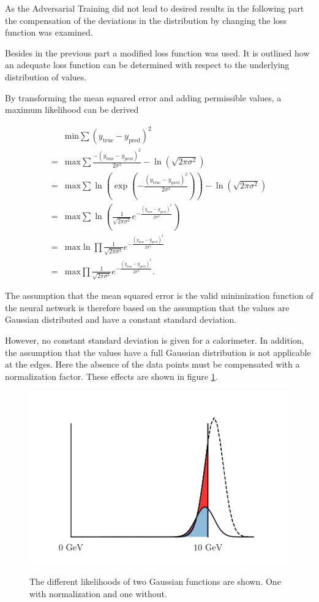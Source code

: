 \documentclass[12pt, a4paper]{thesis}
\begin{document}
As the Adversarial Training did not lead to desired results in the
following part the compensation of the deviations in the distribution
by changing the loss function was examined.

Besides in the previous part a modified loss function was used. It is
outlined how an adequate loss function can be determined with respect
to the underlying distribution of values.

By transforming the mean squared error and adding permissible values,
a maximum likelihood can be derived

\begin{align}
    &\text{min} \sum (y_{\text{true}}-y_{\text{pred}})^2 \\
    =&\text{max} \sum\frac{-(y_{\text{true}}-y_{\text{pred}})^2}{2 \sigma^2} - \ln(\sqrt{2\pi \sigma^2}) \\
    = &\text{max} \sum \ln(\exp(-\frac{(y_{\text{true}}-y_{\text{pred}})^2}{2 \sigma^2})) - \ln(\sqrt{2\pi \sigma^2}) \\
    = &\text{max} \sum \ln( \frac{1}{\sqrt{2\pi \sigma^2}} e^{-\frac{(y_{\text{true}}-y_{\text{pred}})^2}{2 \sigma^2}}) \\
    = &\text{max} \ln \prod \frac{1}{\sqrt{2\pi \sigma^2}} e^{-\frac{(y_{\text{true}}-y_{\text{pred}})^2}{2 \sigma^2}}\\
    = &\text{max} \prod \frac{1}{\sqrt{2\pi \sigma^2}} e^{-\frac{(y_{\text{true}}-y_{\text{pred}})^2}{2 \sigma^2}}.
\end{align}

The assumption that the mean squared error is the valid minimization
function of the neural network is therefore based on the assumption
that the values are Gaussian distributed and have a constant standard
deviation.

However, no constant standard deviation is given for a calorimeter. In
addition, the assumption that the values have a full Gaussian
distribution is not applicable at the edges. Here the absence of the
data points must be compensated with a normalization factor. These
effects are shown in figure \ref{gaussian-shift}.

\begin{figure}[htbp]
\centering
\includegraphics[width=.9\linewidth]{../images/gaussian_shift.png}
\label{gaussian-shift}
\caption{ The different likelihoods of two Gaussian functions are
  shown. One with normalization and one without.}
\end{figure}
\end{document}
